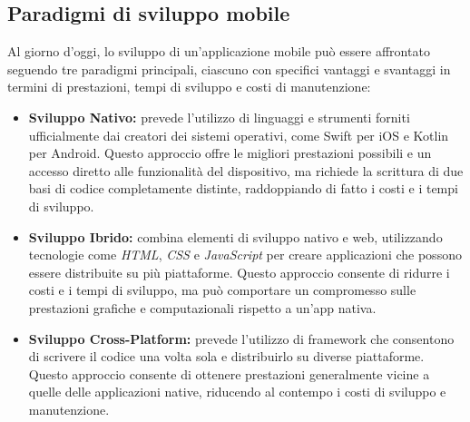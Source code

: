 \subsection*{Paradigmi di sviluppo mobile}
\label{subsec:stato-arte-mobile}
\noindent Al giorno d'oggi, lo sviluppo di un'applicazione mobile può essere affrontato seguendo tre paradigmi principali, ciascuno con specifici vantaggi e svantaggi in termini di prestazioni, tempi di sviluppo e costi di manutenzione:
\begin{itemize}
    \item \textbf{Sviluppo Nativo:} prevede l'utilizzo di linguaggi e strumenti forniti ufficialmente dai creatori dei sistemi operativi, come Swift per iOS e Kotlin per Android. Questo approccio offre le migliori prestazioni possibili e un accesso diretto alle funzionalità del dispositivo, ma richiede la scrittura di due basi di codice completamente distinte, raddoppiando di fatto i costi e i tempi di sviluppo.
    \item \textbf{Sviluppo Ibrido:} combina elementi di sviluppo nativo e web, utilizzando tecnologie come \textit{HTML}, \textit{CSS} e \textit{JavaScript} per creare applicazioni che possono essere distribuite su più piattaforme. Questo approccio consente di ridurre i costi e i tempi di sviluppo, ma può comportare un compromesso sulle prestazioni grafiche e computazionali rispetto a un'app nativa.
    \item \textbf{Sviluppo Cross-Platform:} prevede l'utilizzo di framework che consentono di scrivere il codice una volta sola e distribuirlo su diverse piattaforme. Questo approccio consente di ottenere prestazioni generalmente vicine a quelle delle applicazioni native, riducendo al contempo i costi di sviluppo e manutenzione.
\end{itemize}

